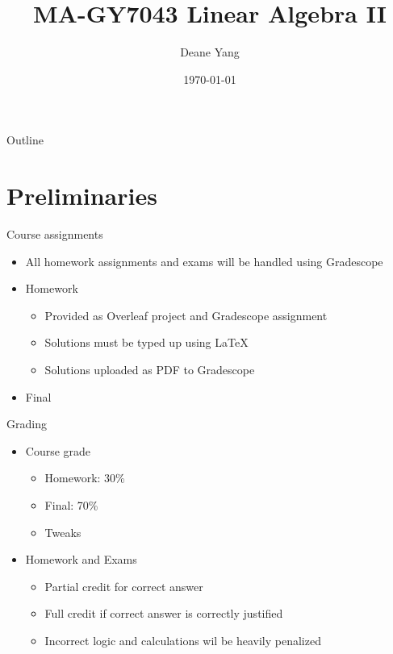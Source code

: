 \documentclass[usenames,dvipsnames,10pt]{beamer}
\author[]{Deane Yang}
\institute[NYU Courant]
{
  Courant Institute of Mathematical Sciences\\
  New York University
}
\title[]
{MA-GY7043 Linear Algebra II}
\date{\today}
\begin{document}

\begin{frame}
  \titlepage
\end{frame}

\begin{frame}[allowframebreaks]{Outline}
  \tableofcontents
\end{frame}

\section{Preliminaries}

\begin{frame}
  {Course assignments}

  \begin{itemize}
  \item All homework assignments and exams will be handled using Gradescope
  \item Homework
    \begin{itemize}
    \item Provided as Overleaf project and Gradescope assignment
    \item Solutions must be typed up using LaTeX
    \item Solutions uploaded as PDF to Gradescope
    \end{itemize}
  \item Final
  \end{itemize}
\end{frame}

\begin{frame}
  {Grading}
  \begin{itemize}
  \item Course grade
    \begin{itemize}
    \item Homework: 30\%
    \item Final: 70\%
    \item Tweaks
    \end{itemize}
  \item Homework and Exams
    \begin{itemize}
    \item Partial credit for correct answer
    \item Full credit if correct answer is correctly justified
    \item Incorrect logic and calculations wil be heavily penalized
    \end{itemize}
  \end{itemize}
\end{frame}
\end{document}
